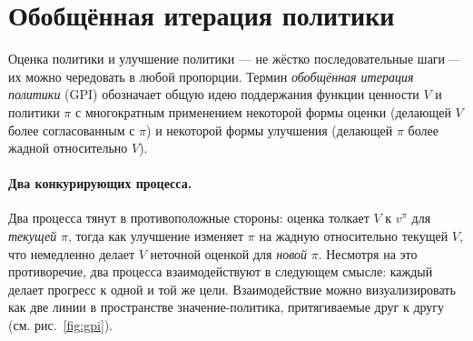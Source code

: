 \section{Обобщённая итерация политики}
\label{sec:gpi}

Оценка политики и улучшение политики — не жёстко последовательные шаги\,---\,их можно чередовать в любой пропорции.  Термин \emph{обобщённая итерация политики} (GPI) обозначает общую идею поддержания функции ценности $V$ и политики $\pi$ с многократным применением некоторой формы оценки (делающей $V$ более согласованным с $\pi$) и некоторой формы улучшения (делающей $\pi$ более жадной относительно $V$).

\paragraph{Два конкурирующих процесса.}
Два процесса тянут в противоположные стороны: оценка толкает $V$ к $v^\pi$ для \emph{текущей} $\pi$, тогда как улучшение изменяет $\pi$ на жадную относительно текущей $V$, что немедленно делает $V$ неточной оценкой для \emph{новой} $\pi$.  Несмотря на это противоречие, два процесса взаимодействуют в следующем смысле: каждый делает прогресс к одной и той же цели.  Взаимодействие можно визуализировать как две линии в пространстве значение-политика, притягиваемые друг к другу (см. рис.~\ref{fig:gpi}).

